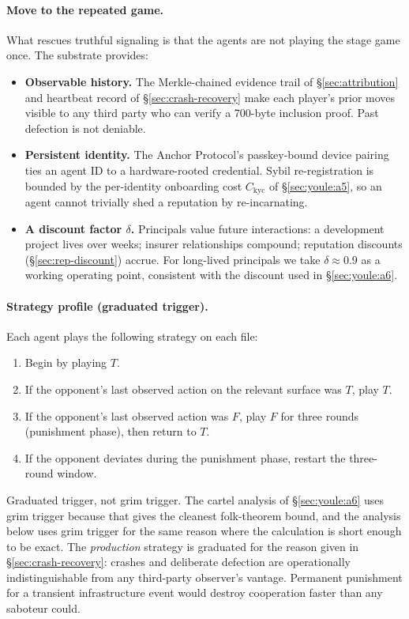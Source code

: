 \documentclass[11pt,a4paper]{article}
\theoremstyle{definition}
\theoremstyle{remark}
\begin{document}
\paragraph{Move to the repeated game.}
What rescues truthful signaling is that the agents are not playing the stage game once. The substrate provides:
\begin{itemize}[nosep]
  \item \textbf{Observable history.} The Merkle-chained evidence trail of \S\ref{sec:attribution} and heartbeat record of \S\ref{sec:crash-recovery} make each player's prior moves visible to any third party who can verify a 700-byte inclusion proof. Past defection is not deniable.
  \item \textbf{Persistent identity.} The Anchor Protocol's passkey-bound device pairing~\cite{owens2026anchor} ties an agent ID to a hardware-rooted credential. Sybil re-registration is bounded by the per-identity onboarding cost $C_{\mathrm{kyc}}$ of \S\ref{sec:youle:a5}, so an agent cannot trivially shed a reputation by re-incarnating.
  \item \textbf{A discount factor $\delta$.} Principals value future interactions: a development project lives over weeks; insurer relationships compound; reputation discounts (\S\ref{sec:rep-discount}) accrue. For long-lived principals we take $\delta \approx 0.9$ as a working operating point, consistent with the discount used in \S\ref{sec:youle:a6}.
\end{itemize}

\paragraph{Strategy profile (graduated trigger).}
Each agent plays the following strategy on each file:
\begin{enumerate}[nosep]
  \item Begin by playing $T$.
  \item If the opponent's last observed action on the relevant surface was $T$, play $T$.
  \item If the opponent's last observed action was $F$, play $F$ for three rounds (punishment phase), then return to $T$.
  \item If the opponent deviates during the punishment phase, restart the three-round window.
\end{enumerate}

Graduated trigger, not grim trigger. The cartel analysis of \S\ref{sec:youle:a6} uses grim trigger because that gives the cleanest folk-theorem bound, and the analysis below uses grim trigger for the same reason where the calculation is short enough to be exact. The \emph{production} strategy is graduated for the reason given in \S\ref{sec:crash-recovery}: crashes and deliberate defection are operationally indistinguishable from any third-party observer's vantage. Permanent punishment for a transient infrastructure event would destroy cooperation faster than any saboteur could.
\end{document}
